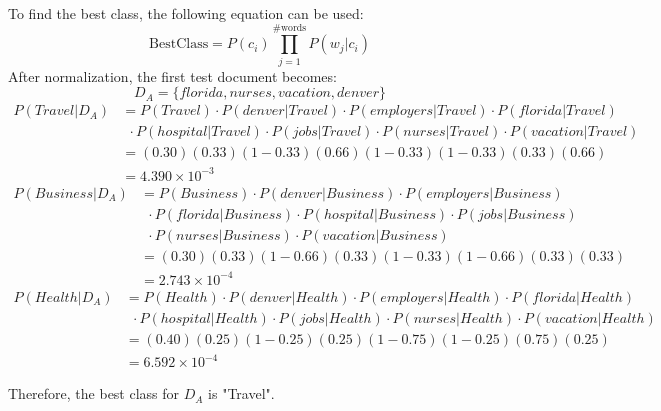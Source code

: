 \documentclass[11pt]{article}
\begin{document}
\begin{enumerate}
        To find the best class, the following equation can be used:
        \begin{equation*}
            \text{BestClass} = P(c_i)\prod_{j=1}^{\text{\# words}}P(w_j | c_i)
        \end{equation*}
        After normalization, the first test document becomes: 
        \begin{equation*}
            D_A=\{florida, nurses, vacation, denver\}
        \end{equation*}
        \begin{align*}
            P(Travel | D_A) &= P(Travel) \cdot P(denver | Travel) \cdot P(employers | Travel) \cdot P(florida | Travel) \\
            & \ \ \cdot P(hospital | Travel) \cdot P(jobs | Travel) \cdot P(nurses | Travel) \cdot P(vacation | Travel) \\
            &= (0.30)(0.33)(1 - 0.33)(0.66)(1 - 0.33)(1 - 0.33)(0.33)(0.66) \\
            &= 4.390\times10^{-3}
        \end{align*}
        \begin{align*}
            P(Business | D_A) &= P(Business) \cdot P(denver | Business) \cdot P(employers | Business) \\
            & \ \ \cdot P(florida | Business) \cdot P(hospital | Business) \cdot P(jobs | Business) \\
            & \ \ \cdot P(nurses | Business) \cdot P(vacation | Business) \\
            &= (0.30)(0.33)(1 - 0.66)(0.33)(1 - 0.33)(1 - 0.66)(0.33)(0.33) \\
            &= 2.743\times10^{-4}
        \end{align*}
        \begin{align*}
            P(Health | D_A) &= P(Health) \cdot P(denver | Health) \cdot P(employers | Health) \cdot P(florida | Health) \\
            & \ \ \cdot P(hospital | Health) \cdot P(jobs | Health) \cdot P(nurses | Health) \cdot P(vacation | Health) \\
            &= (0.40)(0.25)(1 - 0.25)(0.25)(1 - 0.75)(1 - 0.25)(0.75)(0.25)            \\
            &= 6.592\times10^{-4}
        \end{align*}

        Therefore, the best class for $D_A$ is "Travel".


\end{enumerate}
\end{document}

